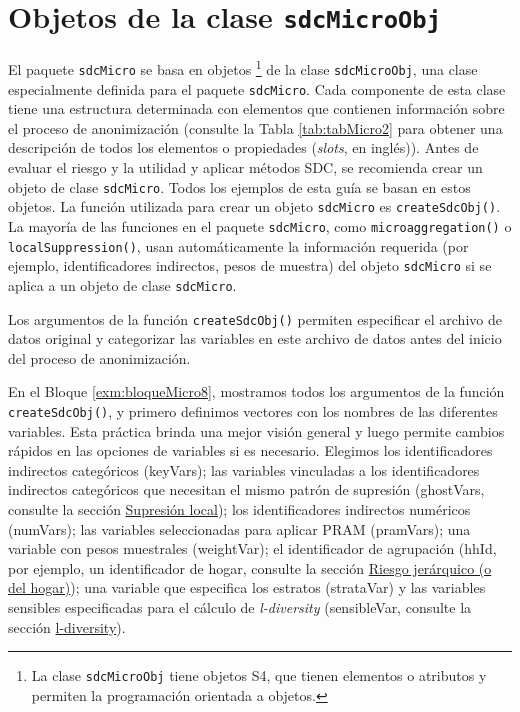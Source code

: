 \documentclass[]{book}
\theoremstyle{definition}
\theoremstyle{definition}
\theoremstyle{definition}
\theoremstyle{definition}
\theoremstyle{remark}
\begin{document}
\hypertarget{objetos-de-la-clase-sdcmicroobj}{%
\section{\texorpdfstring{Objetos de la clase \texttt{sdcMicroObj}}{Objetos de la clase sdcMicroObj}}\label{objetos-de-la-clase-sdcmicroobj}}

El paquete \texttt{sdcMicro} se basa en objetos \footnote{La clase \texttt{sdcMicroObj} tiene objetos S4, que tienen elementos o atributos y permiten la programación orientada a objetos.} de la clase \texttt{sdcMicroObj}, una clase especialmente definida para el paquete \texttt{sdcMicro}. Cada componente de esta clase tiene una estructura determinada con elementos que contienen información sobre el proceso de anonimización (consulte la Tabla \ref{tab:tabMicro2} para obtener una descripción de todos los elementos o propiedades (\emph{slots}, en inglés)). Antes de evaluar el riesgo y la utilidad y aplicar métodos SDC, se recomienda crear un objeto de clase \texttt{sdcMicro}. Todos los ejemplos de esta guía se basan en estos objetos. La función utilizada para crear un objeto \texttt{sdcMicro} es \texttt{createSdcObj()}. La mayoría de las funciones en el paquete \texttt{sdcMicro}, como \texttt{microaggregation()} o \texttt{localSuppression()}, usan automáticamente la información requerida (por ejemplo, identificadores indirectos, pesos de muestra) del objeto \texttt{sdcMicro} si se aplica a un objeto de clase \texttt{sdcMicro}.

Los argumentos de la función \texttt{createSdcObj()} permiten especificar el archivo de datos original y categorizar las variables en este archivo de datos antes del inicio del proceso de anonimización.

En el Bloque \ref{exm:bloqueMicro8}, mostramos todos los argumentos de la función \texttt{createSdcObj()}, y primero definimos vectores con los nombres de las diferentes variables. Esta práctica brinda una mejor visión general y luego permite cambios rápidos en las opciones de variables si es necesario. Elegimos los identificadores indirectos categóricos (keyVars); las variables vinculadas a los identificadores indirectos categóricos que necesitan el mismo patrón de supresión (ghostVars, consulte la sección \protect\hyperlink{sup-loc}{Supresión local}); los identificadores indirectos numéricos (numVars); las variables seleccionadas para aplicar PRAM (pramVars); una variable con pesos muestrales (weightVar); el identificador de agrupación (hhId, por ejemplo, un identificador de hogar, consulte la sección \protect\hyperlink{riesgo-jeruxe1rquico-o-del-hogar}{Riesgo jerárquico (o del hogar)}); una variable que especifica los estratos (strataVar) y las variables sensibles especificadas para el cálculo de \emph{l-diversity} (sensibleVar, consulte la sección \protect\hyperlink{l-diversity}{l-diversity}).
\end{document}
